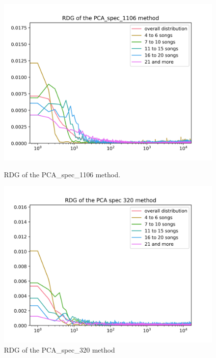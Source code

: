 \begin{figure}[h]
\centering
\begin{minipage}{.45\textwidth}
  \centering
  \includegraphics[width=1\linewidth]{./img/pca_spec_1106_graph.png}
  \caption[RDG of the PCA\_spec\_1106 method.]{RDG of the \newline PCA\_spec\_1106 method.}
  \label{fig:pca_spec_1106_distribution}
\end{minipage}
 \vspace{1cm}
\begin{minipage}{.45\textwidth}
  \centering
  \includegraphics[width=1\linewidth]{./img/pca_spec_320_graph.png}
  \caption[RDG of the PCA\_spec\_320 method]{RDG of the \newline PCA\_spec\_320 method}
  \label{fig:pca_spec_320_distribution}
\end{minipage}
\end{figure}

